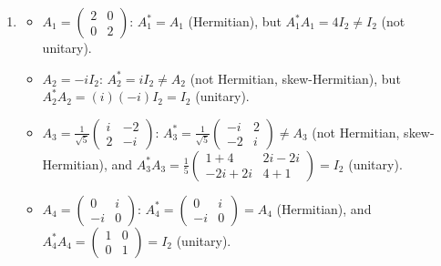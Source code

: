\begin{exercisesolution}
\begin{enumerate}[label=\textbf{(\alph*)}]
    \item \begin{itemize}
        \item $A_1 = \left(\begin{smallmatrix} 2 & 0 \\ 0 & 2 \end{smallmatrix}\right)$: $A_1^* = A_1$ (Hermitian), but $A_1^* A_1 = 4I_2 \ne I_2$ (not unitary).
        \item $A_2 = -i I_2$: $A_2^* = i I_2 \ne A_2$ (not Hermitian, skew-Hermitian), but $A_2^* A_2 = (i)(-i)I_2 = I_2$ (unitary).
        \item $A_3 = \frac{1}{\sqrt{5}}\left(\begin{smallmatrix} i & -2 \\ 2 & -i \end{smallmatrix}\right)$: $A_3^* = \frac{1}{\sqrt{5}}\left(\begin{smallmatrix} -i & 2 \\ -2 & i \end{smallmatrix}\right) \ne A_3$ (not Hermitian, skew-Hermitian), and $A_3^* A_3 = \frac{1}{5}\left(\begin{smallmatrix} 1+4 & 2i - 2i \\ -2i + 2i & 4+1 \end{smallmatrix}\right) = I_2$ (unitary).
        \item $A_4 = \left(\begin{smallmatrix} 0 & i \\ -i & 0 \end{smallmatrix}\right)$: $A_4^* = \left(\begin{smallmatrix} 0 & i \\ -i & 0 \end{smallmatrix}\right) = A_4$ (Hermitian), and $A_4^* A_4 = \left(\begin{smallmatrix} 1 & 0 \\ 0 & 1 \end{smallmatrix}\right) = I_2$ (unitary).
    \end{itemize}


\end{enumerate}
\end{exercisesolution}

